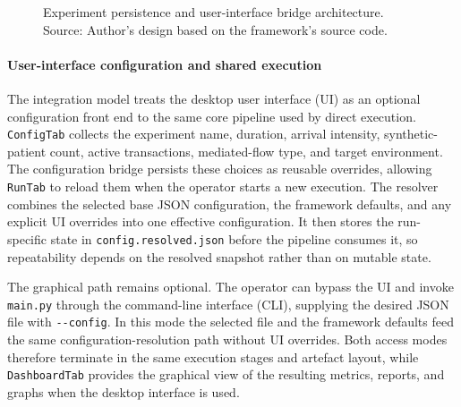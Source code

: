 \begin{figure}[H]
{
    }
    \caption[Experiment persistence and user-interface bridge architecture]{Experiment persistence and user-interface bridge architecture. Source: Author's design based on the framework's source code.}
    \label{fig:rdg-ui-persistence-bridge}
\end{figure}

\paragraph{User-interface configuration and shared execution}
\noindent The integration model treats the desktop user interface (UI) as an optional
configuration front end to the same core pipeline used by direct execution.
\texttt{ConfigTab} collects the experiment name, duration, arrival intensity,
synthetic-patient count, active transactions, mediated-flow type, and target
environment. The configuration bridge persists these choices as reusable
overrides, allowing \texttt{RunTab} to reload them when the operator starts a
new execution. The resolver combines the selected base JSON configuration, the framework defaults, and any explicit UI
overrides into one effective configuration. It then stores the run-specific
state in \texttt{config.resolved.json} before the pipeline consumes it, so
repeatability depends on the resolved snapshot rather than on mutable state.

\noindent The graphical path remains optional. The operator can bypass the UI and invoke
\texttt{main.py} through the command-line interface (CLI), supplying the desired
JSON file with \texttt{-{}-config}. In this mode the selected file and the
framework defaults feed the same configuration-resolution path without UI
overrides. Both access modes therefore terminate in the same execution stages
and artefact layout, while \texttt{DashboardTab} provides the graphical view of
the resulting metrics, reports, and graphs when the desktop interface is used.

